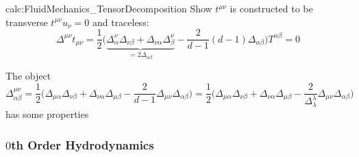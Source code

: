 \begin{calc}{calc:FluidMechanics_TensorDecomposition}
    Show $t^{\mu\nu}$ is constructed to be transverse $t^{\mu\nu}u_\nu=0$ and traceless:
    \begin{equation*}
        \Delta^{\mu\nu}t_{\mu\nu} =\frac{1}{2}\Big(\underbrace{\Delta^\nu_\alpha\Delta_{\nu\beta}+\Delta_{\nu\alpha}\Delta^\nu_\beta}_{=2\Delta_{\alpha\beta}}-\frac{2}{d-1}(d-1)\Delta_{\alpha\beta}\Big)T^{\alpha\beta}=0
    \end{equation*}
\end{calc}
The object
\begin{equation}
    \Delta^{\mu\nu}_{\alpha\beta}=\frac{1}{2}\Big(\Delta_{\mu\alpha}\Delta_{\nu\beta}+\Delta_{\nu\alpha}\Delta_{\mu\beta}-\frac{2}{d-1}\Delta_{\mu\nu}\Delta_{\alpha\beta}\Big)=\frac{1}{2}\Big(\Delta_{\mu\alpha}\Delta_{\nu\beta}+\Delta_{\nu\alpha}\Delta_{\mu\beta}-\frac{2}{\Delta^\lambda_\lambda}\Delta_{\mu\nu}\Delta_{\alpha\beta}\Big)
\end{equation}
has some properties 

\subsubsection{$0$th Order Hydrodynamics}


